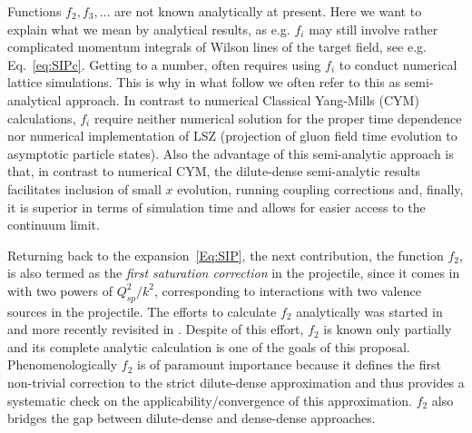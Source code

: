 Functions $f_2 , f_3 , \ldots$ are
not known analytically at present.
Here we want to explain what we mean by  analytical results, 
as e.g. $f_i$ may still involve rather  complicated momentum integrals 
of  Wilson lines of the target field, see e.g. Eq.~\eqref{eq:SIPc}. 
Getting to a number, often requires using $f_i$ to 
conduct numerical lattice simulations. This is why in what follow we 
often refer to this as semi-analytical approach. 
In contrast to numerical Classical Yang-Mills (CYM)
calculations, $f_i$ require neither numerical solution 
for the proper time dependence nor numerical implementation of 
LSZ (projection of gluon field time evolution to asymptotic particle states). 
Also the advantage of this semi-analytic  
approach is that, in contrast to numerical CYM, the dilute-dense semi-analytic 
results facilitates inclusion of small $x$ evolution, 
running coupling corrections and, finally, it is superior 
in terms of simulation time and allows for easier access to 
the continuum limit. 
 

Returning back to the expansion~\eqref{Eq:SIP},  
the next contribution, 
the function $f_2$, is  also termed as the {\it first saturation correction} in the
projectile, since it comes in with two powers of $Q_{sp}^2/k^2$,
corresponding to interactions with two valence sources in the projectile. 
The efforts to calculate $f_2$ analytically was started in
\myref\cite{Balitsky:2004rr} and more recently revisited in
\myref\cite{Chirilli:2015tea}. Despite of this effort,  $f_2$ is known only partially 
and its complete analytic calculation is one of the goals of this proposal. 
Phenomenologically $f_2$ is of paramount importance because it defines the first non-trivial 
correction to the strict dilute-dense approximation and thus provides a systematic
check on the applicability/convergence  of this approximation. 
$f_2$  also bridges the gap between dilute-dense and dense-dense 
approaches. 


 
